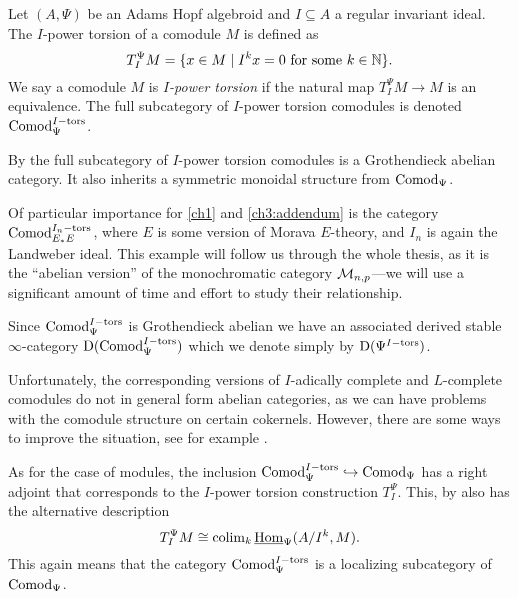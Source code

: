 \begin{definition}
    \label{ch0:def:I-power-torsion-comodule}
    Let $(A,\Psi)$ be an Adams Hopf algebroid and $I\subseteq A$ a regular invariant ideal. The $I$-power torsion of a comodule $M$ is defined as 
    \[T_I^\Psi M = \{x\in M \mid I^kx = 0 \text{ for some } k\in \mathbb{N}\}.\]
    We say a comodule $M$ is \emph{$I$-power torsion} if the natural map $T_I^\Psi M\longrightarrow M$ is an equivalence. The full subcategory of $I$-power torsion comodules is denoted $\mathrm{Comod}_\Psi^{I-\mathrm{tors}}$. 
\end{definition}

\begin{remark}
    \label{ch0:rm:torsion-comodules-grothendieck-monoidal}
    By \cite[5.10]{barthel-heard-valenzuela_2018} the full subcategory of $I$-power torsion comodules is a Grothendieck abelian category. It also inherits a symmetric monoidal structure from $\mathrm{Comod}_\Psi$.
\end{remark}

\begin{example}
    Of particular importance for \cref{ch1} and \cref{ch3:addendum} is the category $\mathrm{Comod}_{E_*E}^{I_n-\mathrm{tors}}$, where $E$ is some version of Morava $E$-theory, and $I_n$ is again the Landweber ideal. This example will follow us through the whole thesis, as it is the ``abelian version'' of the monochromatic category $\mathcal{M}_{n,p}$---we will use a significant amount of time and effort to study their relationship. 
\end{example}

\begin{notation}
    Since $\mathrm{Comod}_\Psi^{I-\mathrm{tors}}$ is Grothendieck abelian we have an associated derived stable $\infty$-category $\mathrm{D}(\mathrm{Comod}_\Psi^{I-\mathrm{tors}})$ which we denote simply by $\mathrm{D}(\Psi^{I-\mathrm{tors}})$.
\end{notation}

\begin{remark}
    \label{ch0:rm:complete-comodules-not-abelian}
    Unfortunately, the corresponding versions of $I$-adically complete and $L$-complete comodules do not in general form abelian categories, as we can have problems with the comodule structure on certain cokernels. However, there are some ways to improve the situation, see for example \cite{baker_2009}. 
\end{remark}

\begin{remark}
    As for the case of modules, the inclusion $\mathrm{Comod}_\Psi^{I-\mathrm{tors}}\hookrightarrow \mathrm{Comod}_\Psi$ has a right adjoint that corresponds to the $I$-power torsion construction $T_I^\Psi$. This, by \cite[5.5]{barthel-heard-valenzuela_2018} also has the alternative description
    \[T_I^\Psi M \cong \operatorname{colim}_k \operatorname{\underline{Hom}}_\Psi (A/I^k, M).\]
    This again means that the category $\mathrm{Comod}_\Psi^{I-\mathrm{tors}}$ is a localizing subcategory of $\mathrm{Comod}_\Psi$. 
\end{remark}


